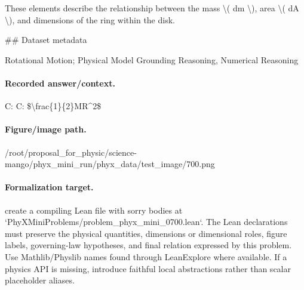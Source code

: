 These elements describe the relationship between the mass \textbackslash{}( dm \textbackslash{}), area \textbackslash{}( dA \textbackslash{}), and dimensions of the ring within the disk.

\#\# Dataset metadata

Rotational Motion; Physical Model Grounding Reasoning, Numerical Reasoning

\paragraph{Recorded answer/context.}
C: C: \$\textbackslash{}frac\{1\}\{2\}MR\textasciicircum{}2\$

\paragraph{Figure/image path.}
/root/proposal\_for\_physic/science-mango/phyx\_mini\_run/phyx\_data/test\_image/700.png

\paragraph{Formalization target.}
create a compiling Lean file with sorry bodies at `PhyXMiniProblems/problem\_phyx\_mini\_0700.lean`. The Lean declarations must preserve the physical quantities, dimensions or dimensional roles, figure labels, governing-law hypotheses, and final relation expressed by this problem.
Use Mathlib/Physlib names found through LeanExplore where available. If a physics API is missing, introduce faithful local abstractions rather than scalar placeholder aliases.

